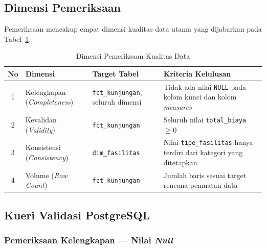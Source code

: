 \subsection{Dimensi Pemeriksaan}

Pemeriksaan mencakup empat dimensi kualitas data utama yang dijabarkan
pada Tabel~\ref{tab:dq_dimensions}.

\begin{table}[H]
  \centering
  \caption{Dimensi Pemeriksaan Kualitas Data}
  \label{tab:dq_dimensions}
  \small
  \begin{tabularx}{\linewidth}{cp{3.5cm}p{3cm}X}
    \toprule
    \textbf{No} & \textbf{Dimensi} & \textbf{Target Tabel} & \textbf{Kriteria Kelulusan} \\
    \midrule
    1 & Kelengkapan \newline (\textit{Completeness})
      & \texttt{fct\_kunjungan}, \newline seluruh dimensi
      & Tidak ada nilai \texttt{NULL} pada kolom kunci dan kolom \textit{measures} \\
    \midrule
    2 & Kevalidan \newline (\textit{Validity})
      & \texttt{fct\_kunjungan}
      & Seluruh nilai \texttt{total\_biaya} $\geq 0$ \\
    \midrule
    3 & Konsistensi \newline (\textit{Consistency})
      & \texttt{dim\_fasilitas}
      & Nilai \texttt{tipe\_fasilitas} hanya terdiri dari kategori yang ditetapkan \\
    \midrule
    4 & Volume \newline (\textit{Row Count})
      & \texttt{fct\_kunjungan}
      & Jumlah baris sesuai target rencana pemuatan data \\
    \bottomrule
  \end{tabularx}
\end{table}

\subsection{Kueri Validasi PostgreSQL}

\subsubsection{Pemeriksaan Kelengkapan --- Nilai \textit{Null}}

